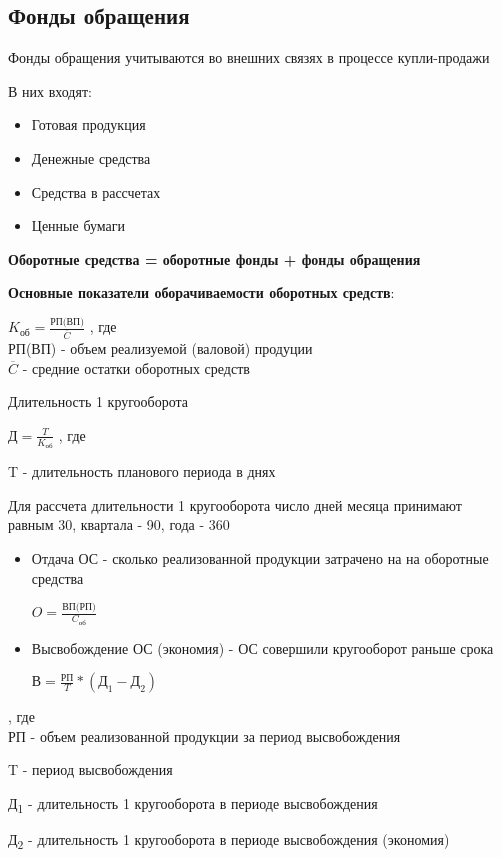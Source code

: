 \documentclass[11pt]{article}
\begin{document}
\subsection{Фонды обращения}
\label{sec:org3481e83}
Фонды обращения учитываются во внешних связях в процессе купли-продажи

\begin{center}
В них входят:
\end{center}

\begin{itemize}
\item Готовая продукция
\item Денежные средства
\item Средства в рассчетах
\item Ценные бумаги
\end{itemize}

\begin{center}
\textbf{Оборотные средства = оборотные фонды + фонды обращения}
\end{center}

\begin{center}
\textbf{Основные показатели оборачиваемости оборотных средств}:
\end{center}

$K_{\text{об}} = \frac{\text{РП(ВП)}}{\overline{C}}$
, где \\[0pt]

РП(ВП) - объем реализуемой (валовой) продуции \\[0pt]

\(\overline{C}\) - средние остатки оборотных средств

Длительность 1 кругооборота

$\text{Д} = \frac{T}{K_{\text{об}}}$
, где

T - длительность планового периода в днях

Для рассчета длительности 1 кругооборота число дней месяца принимают равным 30, квартала - 90, года - 360 \\[0pt]

\begin{itemize}
\item Отдача ОС - сколько реализованной продукции затрачено на на оборотные средства

$O = \frac{\text{ВП(РП)}}{C_{\text{об}}}$

\item Высвобождение ОС (экономия) - ОС совершили кругооборот раньше срока

$\text{В} = \frac{\text{РП}}{T} * (\text{Д}_1 - \text{Д}_2)$
\end{itemize}
, где \\[0pt]

РП - объем реализованной продукции за период высвобождения

T - период высвобождения

Д\textsubscript{1} - длительность 1 кругооборота в периоде высвобождения

Д\textsubscript{2} - длительность 1 кругооборота в периоде высвобождения (экономия)
\end{document}
